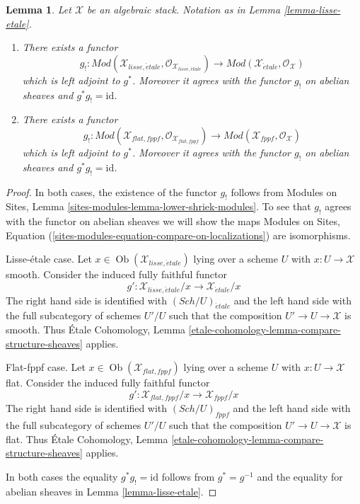 \documentclass[10pt,a4paper]{amsart}
\theoremstyle{plain}
\newtheorem{lemma}[subsection]{Lemma}
\theoremstyle{definition}
\theoremstyle{remark}
\numberwithin{equation}{subsection}
\def\Sch{\mathit{Sch}}
\def\Ob{\mathop{\mathrm{Ob}}\nolimits}
\def\etale{{\acute{e}tale}}
\begin{document}
\begin{lemma}
\label{lemma-lisse-etale-modules}
Let $\mathcal{X}$ be an algebraic stack. Notation as in
Lemma \ref{lemma-lisse-etale}.
\begin{enumerate}
\item There exists a functor
$$
g_! :
\textit{Mod}(\mathcal{X}_{lisse,\etale},
\mathcal{O}_{\mathcal{X}_{lisse,\etale}})
\longrightarrow
\textit{Mod}(\mathcal{X}_\etale, \mathcal{O}_{\mathcal{X}})
$$
which is left adjoint to $g^*$. Moreover it agrees with the functor $g_!$
on abelian sheaves and $g^*g_! = \text{id}$.
\item There exists a functor
$$
g_! :
\textit{Mod}(\mathcal{X}_{flat,fppf},
\mathcal{O}_{\mathcal{X}_{flat,fppf}})
\longrightarrow
\textit{Mod}(\mathcal{X}_{fppf}, \mathcal{O}_{\mathcal{X}})
$$
which is left adjoint to $g^*$. Moreover it agrees with the functor $g_!$
on abelian sheaves and $g^*g_! = \text{id}$.
\end{enumerate}
\end{lemma}

\begin{proof}
In both cases, the existence of the functor $g_!$ follows from
Modules on Sites, Lemma \ref{sites-modules-lemma-lower-shriek-modules}.
To see that $g_!$ agrees with the functor on abelian sheaves we will
show the maps Modules on Sites, Equation
(\ref{sites-modules-equation-compare-on-localizations})
are isomorphisms.

\medskip\noindent
Lisse-\'etale case. Let $x \in \Ob(\mathcal{X}_{lisse,\etale})$
lying over a scheme $U$ with $x : U \to \mathcal{X}$ smooth.
Consider the induced fully faithful functor
$$
g' :
\mathcal{X}_{lisse,\etale}/x
\longrightarrow
\mathcal{X}_\etale/x
$$
The right hand side is identified with $(\Sch/U)_\etale$ and the
left hand side with the full subcategory of schemes $U'/U$ such that
the composition $U' \to U \to \mathcal{X}$ is smooth. Thus
\'Etale Cohomology, Lemma
\ref{etale-cohomology-lemma-compare-structure-sheaves}
applies.

\medskip\noindent
Flat-fppf case. Let $x \in \Ob(\mathcal{X}_{flat,fppf})$
lying over a scheme $U$ with $x : U \to \mathcal{X}$ flat.
Consider the induced fully faithful functor
$$
g' :
\mathcal{X}_{flat,fppf}/x
\longrightarrow
\mathcal{X}_{fppf}/x
$$
The right hand side is identified with $(\Sch/U)_{fppf}$ and the
left hand side with the full subcategory of schemes $U'/U$ such that
the composition $U' \to U \to \mathcal{X}$ is flat. Thus
\'Etale Cohomology, Lemma
\ref{etale-cohomology-lemma-compare-structure-sheaves}
applies.

\medskip\noindent
In both cases the equality $g^*g_! = \text{id}$ follows from
$g^* = g^{-1}$ and the
equality for abelian sheaves in Lemma \ref{lemma-lisse-etale}.
\end{proof}
\end{document}

